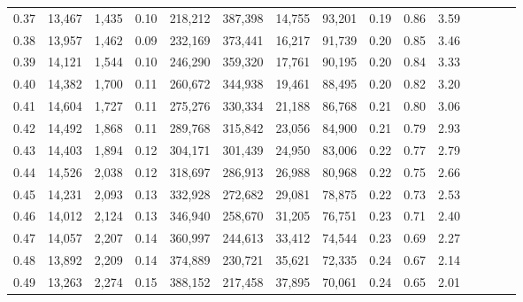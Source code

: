 \begin{tabular}{rrrcrrrrrrrrrrr}
0.37 &  13,467 &  1,435 &                                       0.10 &  218,212 &  387,398 &   14,755 &   93,201 &  0.19 &  0.86 &                         3.59 \\
0.38 &  13,957 &  1,462 &                                       0.09 &  232,169 &  373,441 &   16,217 &   91,739 &  0.20 &  0.85 &                         3.46 \\
0.39 &  14,121 &  1,544 &                                       0.10 &  246,290 &  359,320 &   17,761 &   90,195 &  0.20 &  0.84 &                         3.33 \\
0.40 &  14,382 &  1,700 &                                       0.11 &  260,672 &  344,938 &   19,461 &   88,495 &  0.20 &  0.82 &                         3.20 \\
0.41 &  14,604 &  1,727 &                                       0.11 &  275,276 &  330,334 &   21,188 &   86,768 &  0.21 &  0.80 &                         3.06 \\
0.42 &  14,492 &  1,868 &                                       0.11 &  289,768 &  315,842 &   23,056 &   84,900 &  0.21 &  0.79 &                         2.93 \\
0.43 &  14,403 &  1,894 &                                       0.12 &  304,171 &  301,439 &   24,950 &   83,006 &  0.22 &  0.77 &                         2.79 \\
0.44 &  14,526 &  2,038 &                                       0.12 &  318,697 &  286,913 &   26,988 &   80,968 &  0.22 &  0.75 &                         2.66 \\
0.45 &  14,231 &  2,093 &                                       0.13 &  332,928 &  272,682 &   29,081 &   78,875 &  0.22 &  0.73 &                         2.53 \\
0.46 &  14,012 &  2,124 &                                       0.13 &  346,940 &  258,670 &   31,205 &   76,751 &  0.23 &  0.71 &                         2.40 \\
0.47 &  14,057 &  2,207 &                                       0.14 &  360,997 &  244,613 &   33,412 &   74,544 &  0.23 &  0.69 &                         2.27 \\
0.48 &  13,892 &  2,209 &                                       0.14 &  374,889 &  230,721 &   35,621 &   72,335 &  0.24 &  0.67 &                         2.14 \\
0.49 &  13,263 &  2,274 &                                       0.15 &  388,152 &  217,458 &   37,895 &   70,061 &  0.24 &  0.65 &                         2.01 \\

\end{tabular}
